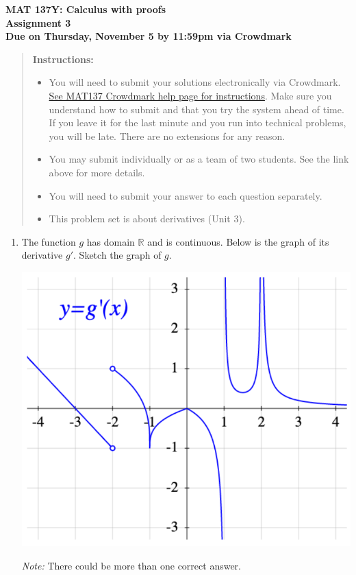 \documentclass[12pt]{exam}
\newcommand{\vv}{\vspace{.4cm}}
\newcommand{\R}{\mathbb{R}}
\begin{document}
{\large
	\begin{center}
		{\bf MAT 137Y: Calculus with proofs}\\
		{\bf Assignment 3} \\
		{\bf Due on Thursday, November 5 by 11:59pm via Crowdmark}
	\end{center}
}

\vv

\begin{quotation}
{\bf Instructions:}
	\begin{itemize}
		\item	 You will need to submit your solutions electronically via Crowdmark.   \href{https://www.math.toronto.edu/~alfonso/137/PS/137_CM.html}{See MAT137 Crowdmark help page for instructions}.  Make sure you understand how to submit and that you try the system ahead of time.  If you leave it for the last minute and you run into technical problems, you will be late.  There are no extensions for any reason.
		\item You may submit individually or as a team of two students.  See the link above for more details.
		\item  You will need to submit your answer to each question separately.
		\item  This problem set is about derivatives (Unit 3).
	\end{itemize}
\end{quotation}
\vv

\begin{enumerate}

\item The function $g$ has domain $\R$ and is continuous.  Below is the graph of its derivative $g'$.  Sketch the graph of $g$.

	\begin{center}
		\includegraphics[scale=.5]{A3G1}
	\end{center}

	\emph{Note:} There could be more than one correct answer.

\end{enumerate}
\end{document}
